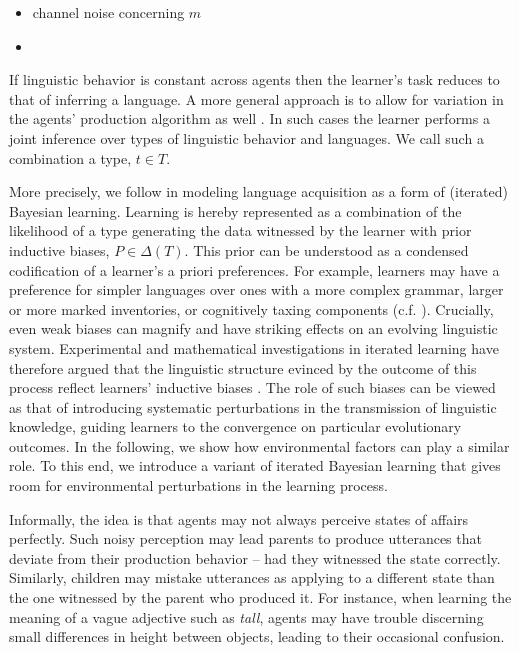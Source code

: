\documentclass[10pt,a4paper]{article}
\begin{document}
\begin{itemize}
\item channel noise concerning $m$
\item 
\end{itemize}

\bigskip



If linguistic behavior is constant across agents then the learner's task reduces to that of inferring a language. A more general approach is to allow for variation in the agents' production algorithm as well \citep{brochhagen+etal:2016:CogSci}. In such cases the learner performs a joint inference over types of linguistic behavior and languages. We call such a combination a type, $t \in T$. 

More precisely, we follow \citet{griffiths+kalish:2007} in modeling language acquisition as a form of (iterated) Bayesian learning. Learning is hereby represented as a combination of the likelihood of a type generating the data witnessed by the learner with prior inductive biases, $P \in \Delta(T)$. This prior can be understood as a condensed codification of a learner's a priori preferences. For example, learners may have a preference for simpler languages over ones with a more complex grammar, larger or more marked inventories, or cognitively taxing components (c.f. \citealt{feldman:2000,chater+vitanyi:2003, kirby+etal:2015}). Crucially, even weak biases can magnify and have striking effects on an evolving linguistic system. Experimental and mathematical investigations in iterated learning have therefore argued that the linguistic structure evinced by the outcome of this process reflect learners' inductive biases \citep{kirby+etal:2007,kirby+etal:2014}. The role of such biases can be viewed as that of introducing systematic perturbations in the transmission of linguistic knowledge, guiding learners to the convergence on particular evolutionary outcomes. In the following, we show how environmental factors can play a similar role. To this end, we introduce a variant of iterated Bayesian learning that gives room for environmental perturbations in the learning process. 

Informally, the idea is that agents may not always perceive states of affairs perfectly. Such noisy perception may lead parents to produce utterances that deviate from their production behavior -- had they witnessed the state correctly. Similarly, children may mistake utterances as applying to a different state than the one witnessed by the parent who produced it. For instance, when learning the meaning of a vague adjective such as {\em tall}, agents may have trouble discerning small differences in height between objects, leading to their occasional confusion.
\end{document}
